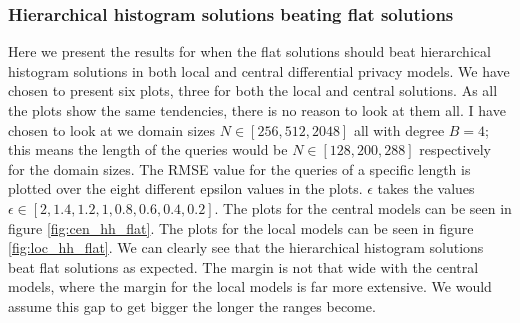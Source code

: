 \documentclass[11pt]{article}
\theoremstyle{definition}
\begin{document}
\subsubsection{Hierarchical histogram solutions beating flat solutions}
Here we present the results for when the flat solutions should beat hierarchical histogram solutions in both local and central differential privacy models. We have chosen to present six plots, three for both the local and central solutions. As all the plots show the same tendencies, there is no reason to look at them all. I have chosen to look at we domain sizes $N\in[256,512,2048]$ all with degree $B=4$; this means the length of the queries would be $N\in[128, 200, 288]$ respectively for the domain sizes. The RMSE value for the queries of a specific length is plotted over the eight different epsilon values in the plots. $\epsilon$ takes the values $\epsilon\in[2, 1.4, 1.2, 1, 0.8, 0.6, 0.4, 0.2]$.  The plots for the central models can be seen in figure \ref{fig:cen_hh_flat}. The plots for the local models can be seen in figure \ref{fig:loc_hh_flat}. We can clearly see that the hierarchical histogram solutions beat flat solutions as expected. The margin is not that wide with the central models, where the margin for the local models is far more extensive. We would assume this gap to get bigger the longer the ranges become.
\end{document}
